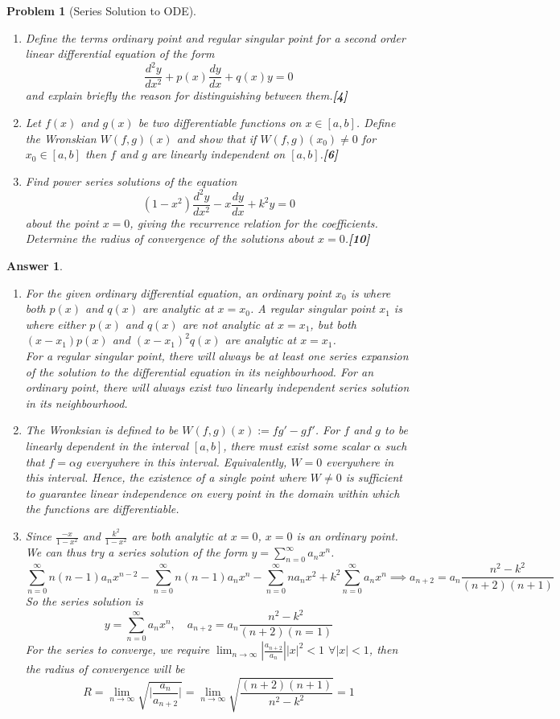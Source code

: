 \documentclass[a4paper]{article}
\newtheorem{ans}{Answer}[section]
\theoremstyle{new}
\newtheorem{qns}{Problem}[section]
\begin{document}
\newpage
\begin{qns}[Series Solution to ODE]\leavevmode
\begin{enumerate}[label=(\alph*)]
\item Define the terms ordinary point and regular singular point for a second order linear differential equation of the form
$$\frac{d^2y}{dx^2}+p(x)\frac{dy}{dx}+q(x)y=0$$
and explain briefly the reason for distinguishing between them.\hfill\textbf{[4]}
\item Let $f(x)$ and $g(x)$ be two differentiable functions on $x\in[a,b]$. Define the Wronskian $W(f, g)(x)$ and show that if $W(f, g)(x_0)\neq 0$ for $x_0\in[a,b]$ then $f$ and $g$ are linearly independent on $[a, b]$.\hfill\textbf{[6]}
\item Find power series solutions of the equation
$$(1-x^2)\frac{d^2y}{dx^2}-x\frac{dy}{dx}+k^2y=0$$
about the point $x = 0$, giving the recurrence relation for the coefficients. Determine the radius of convergence of the solutions about $x = 0$.\hfill\textbf{[10]}
\end{enumerate}
\end{qns}
\begin{ans}\leavevmode
\begin{enumerate}[label=(\alph*)]
\item For the given ordinary differential equation, an ordinary point $x_0$ is where both $p(x)$ and $q(x)$ are analytic at $x=x_0$. A regular singular point $x_1$ is where either $p(x)$ and $q(x)$ are not analytic at $x=x_1$, but both $(x-x_1)p(x)$ and $(x-x_1)^2q(x)$ are analytic at $x=x_1$.\\[5pt]
For a regular singular point, there will always be at least one series expansion of the solution to the differential equation in its neighbourhood. For an ordinary point, there will always exist two linearly independent series solution in its neighbourhood.
\item The Wronksian is defined to be $W(f,g)(x):=fg'-gf'$. For $f$ and $g$ to be linearly dependent in the interval $[a,b]$, there must exist some scalar $\alpha$ such that $f=\alpha g$ everywhere in this interval. Equivalently, $W=0$ everywhere in this interval. Hence, the existence of a single point where $W\neq 0$ is sufficient to guarantee linear independence on every point in the domain within which the functions are differentiable.
\item Since $\frac{-x}{1-x^2}$ and $\frac{k^2}{1-x^2}$ are both analytic at $x=0$, $x=0$ is an ordinary point. We can thus try a series solution of the form $y=\sum_{n=0}^\infty a_nx^n$.
$$\sum_{n=0}^\infty n(n-1)a_nx^{n-2}-\sum_{n=0}^\infty n(n-1)a_nx^n-\sum_{n=0}^\infty na_nx^2+k^2\sum_{n=0}^\infty a_nx^n\implies a_{n+2}=a_n\frac{n^2-k^2}{(n+2)(n+1)}$$
So the series solution is
$$y=\sum_{n=0}^\infty a_nx^n,\quad a_{n+2}=a_n\frac{n^2-k^2}{(n+2)(n=1)}$$
For the series to converge, we require $\lim_{n\rightarrow\infty}|\frac{a_{n+2}}{a_n}||x|^2<1$ $\forall|x|<1$, then the radius of convergence will be
$$R=\lim_{n\rightarrow\infty}\sqrt{\bigg|\frac{a_n}{a_{n+2}}\bigg|}=\lim_{n\rightarrow\infty}\sqrt{\frac{(n+2)(n+1)}{n^2-k^2}}=1$$
\end{enumerate}
\end{ans}
\end{document}
